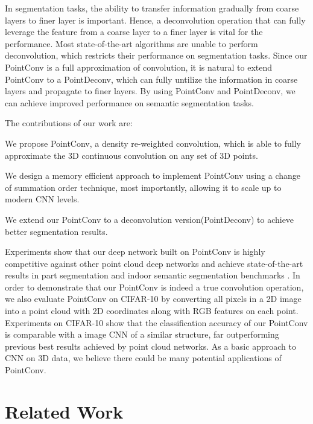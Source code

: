 \documentclass[10pt,twocolumn,letterpaper]{article}
\begin{document}
In segmentation tasks, the ability to transfer information gradually from coarse layers to finer layer is important. Hence, a deconvolution operation \cite{noh2015learning} that can fully leverage the feature from a coarse layer to a finer layer is vital for the performance. Most state-of-the-art algorithms \cite{qi2017pointnet,qi2017pointnet++} are unable to perform deconvolution, which restricts their performance on segmentation tasks. Since our PointConv is a full approximation of convolution, it is natural to extend PointConv to a PointDeconv, which can fully untilize the information in coarse layers and propagate to finer layers. By using PointConv and PointDeconv, we can achieve improved performance on semantic segmentation tasks.

The contributions of our work are:

 We propose PointConv, a density re-weighted convolution, which is able to fully approximate the 3D continuous convolution on any set of 3D points. 

 We design a memory efficient approach to implement PointConv using a change of summation order technique, most importantly, allowing it to scale up to modern CNN levels. 

 We extend our PointConv to a deconvolution version(PointDeconv) to achieve better segmentation results.

Experiments show that our deep network built on PointConv is highly competitive against other point cloud deep networks and achieve state-of-the-art results in part segmentation \cite{chang2015shapenet} and indoor semantic segmentation benchmarks \cite{dai2017scannet}. In order to demonstrate that our PointConv is indeed a true convolution operation, we also evaluate PointConv on CIFAR-10 by converting all pixels in a 2D image into a point cloud with 2D coordinates along with RGB features on each point. Experiments on CIFAR-10  show that the classification accuracy of our PointConv is comparable with a image CNN of a similar structure, far outperforming previous best results achieved by point cloud networks. As a basic approach to CNN on 3D data, we believe there could be many potential applications of PointConv.

\section{Related Work}
\end{document}
